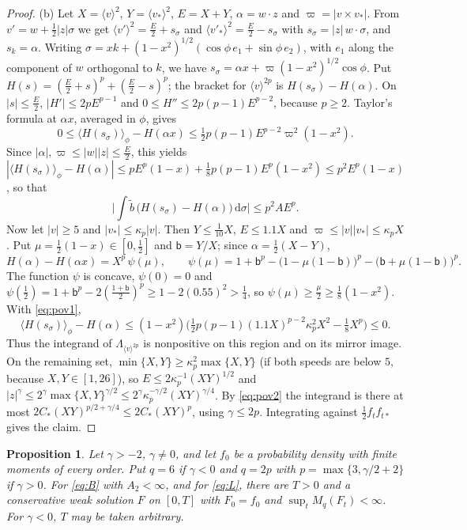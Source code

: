 \documentclass[11pt]{amsart}
\newtheorem{proposition}[theorem]{Proposition}
\theoremstyle{definition}
\newcommand{\dd}{\,\mathrm{d}}
\newcommand{\jb}[1]{\langle #1\rangle}
\begin{document}
\begin{proof}
(b) Let $X=\jb{v}^2$, $Y=\jb{v_*}^2$, $E=X+Y$, $\alpha=w\cdot z$ and $\varpi=|v\times v_*|$. From $v'=w+\frac12|z|\sigma$ we get $\jb{v'}^2=\frac E2+s_\sigma$ and $\jb{v'_*}^2=\frac E2-s_\sigma$ with $s_\sigma=|z|\,w\cdot\sigma$, and $s_k=\alpha$. Writing $\sigma=xk+(1-x^2)^{1/2}(\cos\phi\,e_1+\sin\phi\,e_2)$, with $e_1$ along the component of $w$ orthogonal to $k$, we have $s_\sigma=\alpha x+\varpi(1-x^2)^{1/2}\cos\phi$. Put $H(s)=(\frac E2+s)^p+(\frac E2-s)^p$; the bracket for $\jb{v}^{2p}$ is $H(s_\sigma)-H(\alpha)$. On $|s|\le\frac E2$, $|H'|\le2pE^{p-1}$ and $0\le H''\le2p(p-1)E^{p-2}$, because $p\ge2$. Taylor's formula at $\alpha x$, averaged in $\phi$, gives
\begin{equation}\label{eq:pov1}
0\le\langle H(s_\sigma)\rangle_\phi-H(\alpha x)\le\tfrac12p(p-1)E^{p-2}\varpi^2(1-x^2).
\end{equation}
Since $|\alpha|,\varpi\le|w||z|\le\frac E2$, this yields $|\langle H(s_\sigma)\rangle_\phi-H(\alpha)|\le pE^p(1-x)+\frac18p(p-1)E^p(1-x^2)\le p^2E^p(1-x)$, so that
\begin{equation}\label{eq:pov2}
\Big|\int\tilde b\,\big(H(s_\sigma)-H(\alpha)\big)\dd\sigma\Big|\le p^2AE^p .
\end{equation}
Now let $|v|\ge5$ and $|v_*|\le\kappa_p|v|$. Then $Y\le\frac1{10}X$, $E\le1.1X$ and $\varpi\le|v||v_*|\le\kappa_pX$. Put $\mu=\frac12(1-x)\in[0,\frac12]$ and $\mathsf b=Y/X$; since $\alpha=\frac12(X-Y)$,
\[
H(\alpha)-H(\alpha x)=X^p\,\psi(\mu),\qquad\psi(\mu)=1+\mathsf b^p-\big(1-\mu(1-\mathsf b)\big)^p-\big(\mathsf b+\mu(1-\mathsf b)\big)^p .
\]
The function $\psi$ is concave, $\psi(0)=0$ and $\psi(\frac12)=1+\mathsf b^p-2(\frac{1+\mathsf b}2)^p\ge1-2(0.55)^2>\frac14$, so $\psi(\mu)\ge\frac\mu2\ge\frac18(1-x^2)$. With \eqref{eq:pov1},
\[
\langle H(s_\sigma)\rangle_\phi-H(\alpha)\le(1-x^2)\Big(\tfrac12p(p-1)(1.1X)^{p-2}\kappa_p^2X^2-\tfrac18X^p\Big)\le0 .
\]
Thus the integrand of $\Lambda_{\jb{v}^{2p}}$ is nonpositive on this region and on its mirror image. On the remaining set, $\min\{X,Y\}\ge\kappa_p^2\max\{X,Y\}$ (if both speeds are below $5$, because $X,Y\in[1,26]$), so $E\le2\kappa_p^{-1}(XY)^{1/2}$ and $|z|^\gamma\le2^\gamma\max\{X,Y\}^{\gamma/2}\le2^\gamma\kappa_p^{-\gamma/2}(XY)^{\gamma/4}$. By \eqref{eq:pov2} the integrand is there at most $2C_*(XY)^{p/2+\gamma/4}\le2C_*(XY)^p$, using $\gamma\le2p$. Integrating against $\frac12f_tf_{t*}$ gives the claim.
\end{proof}

\begin{proposition}\label{prop:exist}
Let $\gamma>-2$, $\gamma\ne0$, and let $f_0$ be a probability density with finite moments of every order. Put $q=6$ if $\gamma<0$ and $q=2p$ with $p=\max\{3,\gamma/2+2\}$ if $\gamma>0$. For \eqref{eq:B} with $A_2<\infty$, and for \eqref{eq:L}, there are $T>0$ and a conservative weak solution $F$ on $[0,T]$ with $F_0=f_0$ and $\sup_tM_q(F_t)<\infty$. For $\gamma<0$, $T$ may be taken arbitrary.
\end{proposition}
\end{document}
